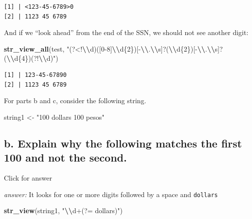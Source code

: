 \documentclass[
]{book}
\newenvironment{Shaded}{\begin{snugshade}}{\end{snugshade}}
\newcommand{\FunctionTok}[1]{\textcolor[rgb]{0.13,0.29,0.53}{\textbf{#1}}}
\newcommand{\NormalTok}[1]{#1}
\newcommand{\OtherTok}[1]{\textcolor[rgb]{0.56,0.35,0.01}{#1}}
\newcommand{\SpecialCharTok}[1]{\textcolor[rgb]{0.81,0.36,0.00}{\textbf{#1}}}
\newcommand{\StringTok}[1]{\textcolor[rgb]{0.31,0.60,0.02}{#1}}
\begin{document}
\begin{verbatim}
[1] | <123-45-6789>0
[2] | 1123 45 6789
\end{verbatim}

And if we ``look ahead'' from the end of the SSN, we should not see another digit:

\begin{Shaded}
\begin{Highlighting}[]
\FunctionTok{str\_view\_all}\NormalTok{(test, }\StringTok{"(?\textless{}!}\SpecialCharTok{\textbackslash{}\textbackslash{}}\StringTok{d)([0{-}8]}\SpecialCharTok{\textbackslash{}\textbackslash{}}\StringTok{d\{2\})[{-}}\SpecialCharTok{\textbackslash{}\textbackslash{}}\StringTok{.}\SpecialCharTok{\textbackslash{}\textbackslash{}}\StringTok{s]?(}\SpecialCharTok{\textbackslash{}\textbackslash{}}\StringTok{d\{2\})[{-}}\SpecialCharTok{\textbackslash{}\textbackslash{}}\StringTok{.}\SpecialCharTok{\textbackslash{}\textbackslash{}}\StringTok{s]?(}\SpecialCharTok{\textbackslash{}\textbackslash{}}\StringTok{d\{4\})(?!}\SpecialCharTok{\textbackslash{}\textbackslash{}}\StringTok{d)"}\NormalTok{)}
\end{Highlighting}
\end{Shaded}

\begin{verbatim}
[1] | 123-45-67890
[2] | 1123 45 6789
\end{verbatim}

For parts b and c, consider the following string.

\begin{Shaded}
\begin{Highlighting}[]
\NormalTok{string1 }\OtherTok{\textless{}{-}} \StringTok{"100 dollars 100 pesos"}
\end{Highlighting}
\end{Shaded}

\hypertarget{b.-explain-why-the-following-matches-the-first-100-and-not-the-second.}{%
\subsection{b. Explain why the following matches the first 100 and not the second.}\label{b.-explain-why-the-following-matches-the-first-100-and-not-the-second.}}

Click for answer

\emph{answer:} It looks for one or more digits followed by a space and \texttt{dollars}

\begin{Shaded}
\begin{Highlighting}[]
\FunctionTok{str\_view}\NormalTok{(string1, }\StringTok{"}\SpecialCharTok{\textbackslash{}\textbackslash{}}\StringTok{d+(?= dollars)"}\NormalTok{)}
\end{Highlighting}
\end{Shaded}
\end{document}
